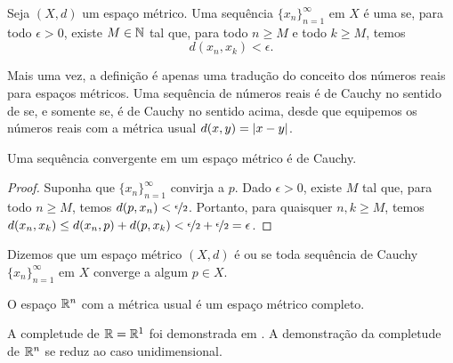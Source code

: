 \begin{defn}
Seja $(X,d)$ um espaço métrico.
Uma sequência $\{ x_n \}_{n=1}^\infty$ em $X$ é uma
\emph{} se, para todo $\epsilon > 0$, existe
$M \in {\mathbb{N}}$ tal que, para todo $n \geq M$ e todo $k \geq M$, temos
\begin{equation*}
d(x_n, x_k) < \epsilon .
\end{equation*}
\end{defn}

Mais uma vez, a definição é apenas uma tradução do conceito dos números
reais para espaços métricos. Uma sequência de números reais é de Cauchy
no sentido de  se, e somente se, é de Cauchy no
sentido acima, desde que equipemos os números reais com a métrica usual
$d(x,y) = \lvert {x-y} \rvert$.

\begin{prop}
Uma sequência convergente em um espaço métrico é de Cauchy.
\end{prop}

\begin{proof}
Suponha que $\{ x_n \}_{n=1}^\infty$ convirja a $p$.
Dado $\epsilon > 0$, existe $M$ tal que, para todo $n \geq M$,
temos $d(p,x_n) < \nicefrac{\epsilon}{2}$. Portanto,
para quaisquer $n,k \geq M$, temos
$d(x_n,x_k) \leq d(x_n,p) + d(p,x_k) < \nicefrac{\epsilon}{2} +
\nicefrac{\epsilon}{2} = \epsilon$.
\end{proof}

\begin{defn}
Dizemos que um espaço métrico $(X,d)$ é
\emph{} ou \emph{}
se toda sequência de Cauchy $\{ x_n \}_{n=1}^\infty$ em $X$
converge a algum $p \in X$.
\end{defn}

\begin{prop}
O espaço ${\mathbb{R}}^n$ com a métrica usual é um espaço métrico completo.
\end{prop}

A completude de ${\mathbb{R}} = {\mathbb{R}}^1$ foi demonstrada em .
A demonstração da completude de ${\mathbb{R}}^n$
se reduz ao caso unidimensional.

